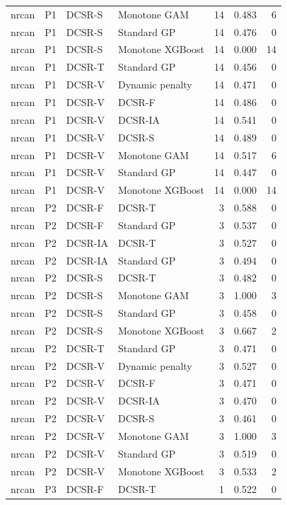 \begin{tabular}{llllrrr}
nrcan & P1 & DCSR-S & Monotone GAM & 14 & 0.483 & 6 \\
nrcan & P1 & DCSR-S & Standard GP & 14 & 0.476 & 0 \\
nrcan & P1 & DCSR-S & Monotone XGBoost & 14 & 0.000 & 14 \\
nrcan & P1 & DCSR-T & Standard GP & 14 & 0.456 & 0 \\
nrcan & P1 & DCSR-V & Dynamic penalty & 14 & 0.471 & 0 \\
nrcan & P1 & DCSR-V & DCSR-F & 14 & 0.486 & 0 \\
nrcan & P1 & DCSR-V & DCSR-IA & 14 & 0.541 & 0 \\
nrcan & P1 & DCSR-V & DCSR-S & 14 & 0.489 & 0 \\
nrcan & P1 & DCSR-V & Monotone GAM & 14 & 0.517 & 6 \\
nrcan & P1 & DCSR-V & Standard GP & 14 & 0.447 & 0 \\
nrcan & P1 & DCSR-V & Monotone XGBoost & 14 & 0.000 & 14 \\
nrcan & P2 & DCSR-F & DCSR-T & 3 & 0.588 & 0 \\
nrcan & P2 & DCSR-F & Standard GP & 3 & 0.537 & 0 \\
nrcan & P2 & DCSR-IA & DCSR-T & 3 & 0.527 & 0 \\
nrcan & P2 & DCSR-IA & Standard GP & 3 & 0.494 & 0 \\
nrcan & P2 & DCSR-S & DCSR-T & 3 & 0.482 & 0 \\
nrcan & P2 & DCSR-S & Monotone GAM & 3 & 1.000 & 3 \\
nrcan & P2 & DCSR-S & Standard GP & 3 & 0.458 & 0 \\
nrcan & P2 & DCSR-S & Monotone XGBoost & 3 & 0.667 & 2 \\
nrcan & P2 & DCSR-T & Standard GP & 3 & 0.471 & 0 \\
nrcan & P2 & DCSR-V & Dynamic penalty & 3 & 0.527 & 0 \\
nrcan & P2 & DCSR-V & DCSR-F & 3 & 0.471 & 0 \\
nrcan & P2 & DCSR-V & DCSR-IA & 3 & 0.470 & 0 \\
nrcan & P2 & DCSR-V & DCSR-S & 3 & 0.461 & 0 \\
nrcan & P2 & DCSR-V & Monotone GAM & 3 & 1.000 & 3 \\
nrcan & P2 & DCSR-V & Standard GP & 3 & 0.519 & 0 \\
nrcan & P2 & DCSR-V & Monotone XGBoost & 3 & 0.533 & 2 \\
nrcan & P3 & DCSR-F & DCSR-T & 1 & 0.522 & 0 \\

\end{tabular}
